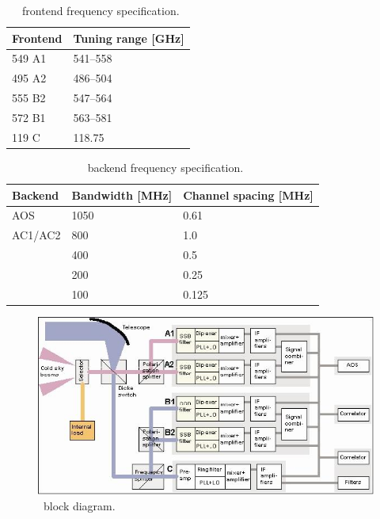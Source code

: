 \begin{table}
\caption{ \smr\ frontend frequency specification.}
\label{table:config1}
\begin{tabular}{|l|l|}
  \hline
  \textbf{Frontend} & \textbf{Tuning range {[}GHz{]} } \\
  \hline
  549 A1            & 541--558              \\
  \hline
  495 A2            & 486--504              \\
  \hline
  555 B2            & 547--564             \\
 \hline
 572 B1             & 563--581              \\
 \hline
  119 C             &  118.75               \\
\hline
\end{tabular}
\end{table}



\begin{table}
\caption{ \smr\ backend frequency specification.}
\label{table:config2}
\begin{tabular}{|l|l|l|}
  \hline
  \textbf{Backend} & \textbf{Bandwidth {[}MHz{]}} & \textbf{Channel spacing {[}MHz{]}} \\
  \hline
  AOS              & 1050                & 0.61\\
  \hline
  AC1/AC2          & 800                 & 1.0
 \\
 \cline{2-2}
 \cline{3-3}
                   & 400                  & 0.5 \\
 \cline{2-2}
 \cline{3-3}
                   & 200                  & 0.25 \\
 \cline{2-2}
 \cline{3-3}
                   & 100                 & 0.125 \\
\hline
\end{tabular}
\end{table}


\begin{figure}[t]
\includegraphics[width=14cm]{Odin_Auto2.jpg}
\caption{\smr\ block diagram.}
\label{fig:blockdiagram}
\end{figure}




